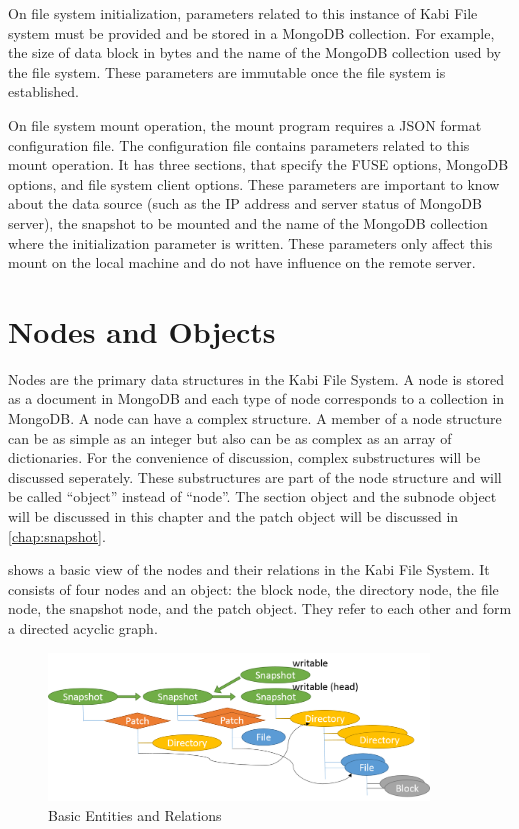     On file system initialization, parameters related to this instance of Kabi File system must be provided and be stored in a MongoDB collection. For example, the size of data block in bytes and the name of the MongoDB collection used by the file system. These parameters are immutable once the file system is established.

    On file system mount operation, the mount program requires a JSON format configuration file. The configuration file contains parameters related to this mount operation. It has three sections, that specify the FUSE options, MongoDB options, and file system client options. These parameters are important to know about the data source (such as the IP address and server status of MongoDB server), the snapshot to be mounted and the name of the MongoDB collection where the initialization parameter is written. These parameters only affect this mount on the local machine and do not have influence on the remote server.

\section{Nodes and Objects}

    Nodes are the primary data structures in the Kabi File System. A node is stored as a document in MongoDB and each type of node corresponds to a collection in MongoDB. A node can have a complex structure. A member of a node structure can be as simple as an integer but also can be as complex as an array of dictionaries. For the convenience of discussion, complex substructures will be discussed seperately. These substructures are part of the node structure and will be called ``object'' instead of ``node''. The section object and the subnode object will be discussed in this chapter and the patch object will be discussed in \cref{chap:snapshot}.

     shows a basic view of the nodes and their relations in the Kabi File System. It consists of four nodes and an object: the block node, the directory node, the file node, the snapshot node, and the patch object. They refer to each other and form a directed acyclic graph. 

\begin{figure}[hbtp]
\centering
\includegraphics[width=0.9\textwidth]{Chapter-3/figs/fig2.png}
\caption{Basic Entities and Relations}
\label{fig:basic_entities}
\end{figure}


